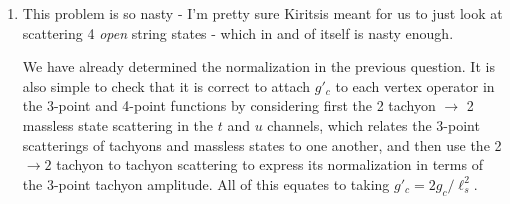 \documentclass[11pt, class=article, crop=false]{standalone}
\begin{document}
\begin{enumerate}
	\begin{equation}\label{eq:factor2}
		i C^2_{3pt} \sum_{\zeta} \zeta_{\mu \nu} \zeta_{\sigma \rho} k_{12}^\mu k_{12}^\nu k_{34}^\sigma k_{34}^\rho \times \frac{1}{-(k_1 + k_2)^2 + i \epsilon}
		= i C^2_{3pt} (k_{12} \cdot k_{34})^2 \times \frac{1}{s}
		 = i C^2_{3pt} \frac{(u-t)^2}{s}
	\end{equation}
	where we have used that, just as the sum over intermediate photon polarizations $\epsilon_\mu \epsilon^*_\nu$ can be replaced by just $\eta_{\mu \nu}$, the sum over intermediate polarizations $\zeta_{\mu \nu} \zeta_{\rho \sigma}$ be replaced by $\frac12 (\eta_{\mu \rho} \eta_{\nu \sigma} + \eta_{\mu \sigma} \eta_{\nu \rho})$. Comparing equations \eqref{eq:factor1} and \eqref{eq:factor2} We the get $C_{3pt} = -\pi i g_c$. Equivalently, $g_c' = 2 g_c /\ell_s^2$.

	\item 
	This problem is so nasty - I'm pretty sure Kiritsis meant for us to just look at scattering 4 \emph{open} string states - which in and of itself is nasty enough. 
	
	We have already determined the normalization in the previous question. It is also simple to check that it is correct to attach $g'_c$ to each vertex operator in the 3-point and 4-point functions by considering first the 2 tachyon $\to$ 2 massless state scattering in the $t$ and $u$ channels, which relates the $3$-point scatterings of tachyons and massless states to one another, and then use the 2 $\to 2$ tachyon to tachyon scattering to express its normalization in terms of the 3-point tachyon amplitude. All of this equates to taking $g'_c = 2 g_c/\ell_s^2$. 
	

\end{enumerate}
\end{document}
